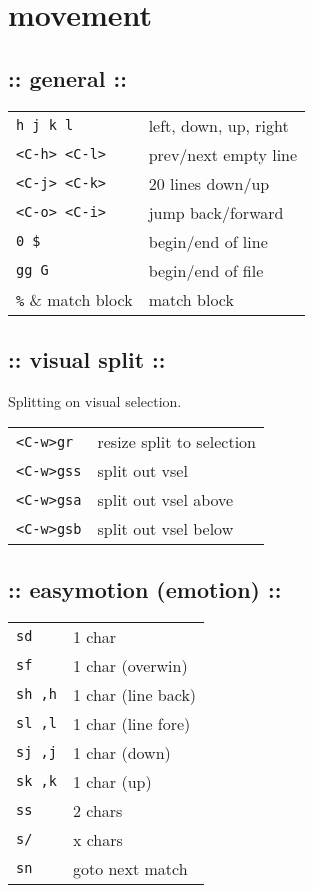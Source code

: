 \section{\hrulefill movement\hrulefill}

\subsection{:: general ::}
\begin{tabular}{@{}ll@{}}
    \verb!h j k l!          & left, down, up, right \\
    \verb!<C-h> <C-l>!      & prev/next empty line \\
    \verb!<C-j> <C-k>!      & 20 lines down/up \\
    \verb!<C-o> <C-i>!      & jump back/forward \\
    \verb!0 $!              & begin/end of line \\
    \verb!gg G!             & begin/end of file \\
    \verb!%!                & match block \\
\end{tabular}

\subsection{:: visual split ::}
Splitting on visual selection. \\
\begin{tabular}{@{}ll@{}}
    \verb!<C-w>gr!          & resize split to selection \\
    \verb!<C-w>gss!         & split out vsel \\
    \verb!<C-w>gsa!         & split out vsel above \\
    \verb!<C-w>gsb!         & split out vsel below \\
\end{tabular}

\subsection{:: easymotion (emotion) ::}
\begin{tabular}{@{}ll@{}}
    \verb!sd!     & 1 char \\
    \verb!sf!     & 1 char (overwin) \\
    \verb!sh ,h!  & 1 char (line back) \\
    \verb!sl ,l!  & 1 char (line fore) \\
    \verb!sj ,j!  & 1 char (down) \\
    \verb!sk ,k!  & 1 char (up) \\
    \verb!ss!     & 2 chars \\
    \verb!s/!     & x chars \\
    \verb!sn!     & goto next match \\
\end{tabular}
